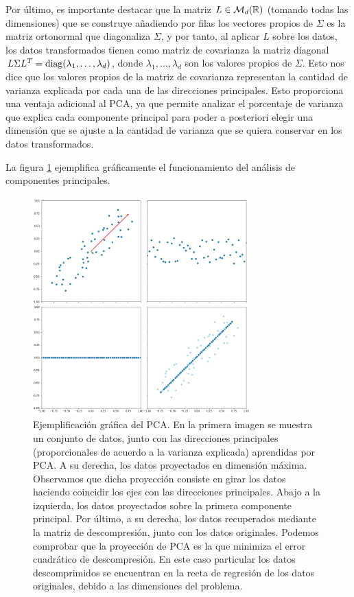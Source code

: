 \documentclass{book}
\begin{document}
Por último, es importante destacar que la matriz $L \in \mathcal{M}_{d}(\mathbb{R})$ (tomando todas las dimensiones) que se construye añadiendo por filas los vectores propios de $\Sigma$ es la matriz ortonormal que diagonaliza $\Sigma$, y por tanto, al aplicar $L$ sobre los datos, los datos transformados tienen como matriz de covarianza la matriz diagonal $L\Sigma L^T = \operatorname{diag}(\lambda_1,\dots,\lambda_d)$, donde $\lambda_1,\dots,\lambda_d$ son los valores propios de $\Sigma$. Esto nos dice que los valores propios de la matriz de covarianza representan la cantidad de varianza explicada por cada una de las direcciones principales. Esto proporciona una ventaja adicional al PCA, ya que permite analizar el porcentaje de varianza que explica cada componente principal para poder a posteriori elegir una dimensión que se ajuste a la cantidad de varianza que se quiera conservar en los datos transformados.

La figura \ref{fig:pca} ejemplifica gráficamente el funcionamiento del análisis de componentes principales.

\begin{figure}[h]
	\centering
	\includegraphics[width=0.75\textwidth]{./images/pca.png}
	\caption{Ejemplificación gráfica del PCA. En la primera imagen se muestra un conjunto de datos, junto con las direcciones principales (proporcionales de acuerdo a la varianza explicada) aprendidas por PCA. A su derecha, los datos proyectados en dimensión máxima. Observamos que dicha proyección consiste en girar los datos haciendo coincidir los ejes con las direcciones principales. Abajo a la izquierda, los datos proyectados sobre la primera componente principal. Por último, a su derecha, los datos recuperados mediante la matriz de descompresión, junto con los datos originales. Podemos comprobar que la proyección de PCA es la que minimiza el error cuadrático de descompresión. En este caso particular los datos descomprimidos se encuentran en la recta de regresión de los datos originales, debido a las dimensiones del problema.} \label{fig:pca}
\end{figure}
\end{document}
